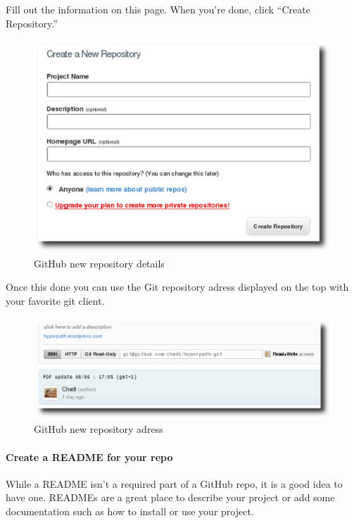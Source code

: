Fill out the information on this page. When you’re done, click ``Create
Repository.''

\begin{figure}[!htb]
  \begin{center}
    \includegraphics{Figures/GitHub_repo_details.eps}
  \end{center}
  \label{GitHub new repository details}
  \caption{GitHub new repository details}
\end{figure}

Once this done you can use the Git repository adress displayed on the top with
your favorite git client.

\begin{figure}[!htb]
  \begin{center}
    \includegraphics{Figures/GitHub_repo_adress.eps}
  \end{center}
  \label{GitHub new repository adress}
  \caption{GitHub new repository adress}
\end{figure}


\paragraph{Create a README for your repo}
While a README isn’t a required part of a GitHub repo, it is a good idea to have
one. READMEs are a great place to describe your project or add some documentation
such as how to install or use your project.

